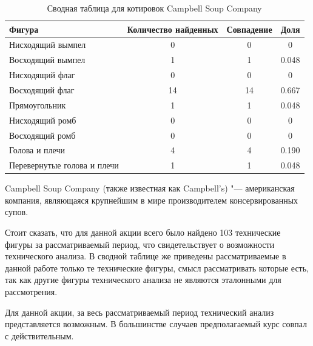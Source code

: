 \documentclass[bachelor, och, coursework]{SCWorks}
\begin{document}
    \begin{table}[!hbt]
        \caption{Сводная таблица для котировок Campbell Soup Company} 
        \centering
        \begin{tabular}{|l|c|c|c|}
        \hline
        Фигура                      & \multicolumn{1}{l|}{Количество найденных} & Совпадение & Доля  \\ \hline
        Нисходящий вымпел           & 0                                         & 0          & 0     \\ \hline
        Восходящий вымпел           & 1                                         & 1          & 0.048 \\ \hline
        Нисходящий флаг             & 0                                         & 0          & 0     \\ \hline
        Восходящий флаг             & 14                                        & 14         & 0.667 \\ \hline
        Прямоугольник               & 1                                         & 1          & 0.048 \\ \hline
        Нисходящий ромб             & 0                                         & 0          & 0     \\ \hline
        Восходящий ромб             & 0                                         & 0          & 0     \\ \hline
        Голова и плечи              & 4                                         & 4          & 0.190 \\ \hline
        Перевернутые голова и плечи & 1                                         & 1          & 0.048 \\ \hline
        \end{tabular}   
    \end{table}

    
    Campbell Soup Company (также известная как Campbell's) "--- американская 
    компания, являющаяся крупнейшим в мире производителем консервированных 
    супов.
    
    Стоит сказать, что для данной акции всего было найдено 103 технические
    фигуры за рассматриваемый период, что свидетельствует о возможности
    технического анализа. В сводной таблице же приведены рассматриваемые в 
    данной работе только те технические фигуры, смысл рассматривать которые
    есть, так как другие фигуры технического анализа не являются эталонными
    для рассмотрения.
    
    Для данной акции, за весь рассматриваемый период технический анализ 
    представляется возможным. В большинстве случаев предполагаемый курс совпал с 
    действительным.
    
\end{document}
